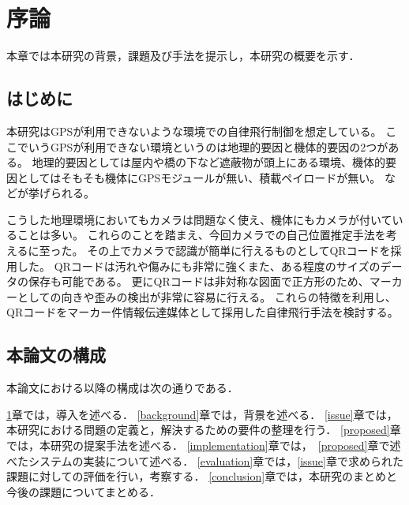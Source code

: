 \chapter{序論}
\label{introduction}

本章では本研究の背景，課題及び手法を提示し，本研究の概要を示す．

\section{はじめに}
\label{introduction:background}
本研究はGPSが利用できないような環境での自律飛行制御を想定している。
ここでいうGPSが利用できない環境というのは地理的要因と機体的要因の2つがある。
地理的要因としては屋内や橋の下など遮蔽物が頭上にある環境、機体的要因としてはそもそも機体にGPSモジュールが無い、積載ペイロードが無い。
などが挙げられる。

こうした地理環境においてもカメラは問題なく使え、機体にもカメラが付いていることは多い。
これらのことを踏まえ、今回カメラでの自己位置推定手法を考えるに至った。
その上でカメラで認識が簡単に行えるものとしてQRコードを採用した。
QRコードは汚れや傷みにも非常に強くまた、ある程度のサイズのデータの保存も可能である。
更にQRコードは非対称な図面で正方形のため、マーカーとしての向きや歪みの検出が非常に容易に行える。
これらの特徴を利用し、QRコードをマーカー件情報伝達媒体として採用した自律飛行手法を検討する。


\section{本論文の構成}

本論文における以降の構成は次の通りである．

\ref{introduction}章では，導入を述べる．
\ref{background}章では，背景を述べる．
\ref{issue}章では，本研究における問題の定義と，解決するための要件の整理を行う．
\ref{proposed}章では，本研究の提案手法を述べる．
\ref{implementation}章では，~\ref{proposed}章で述べたシステムの実装について述べる．
\ref{evaluation}章では，\ref{issue}章で求められた課題に対しての評価を行い，考察する．
\ref{conclusion}章では，本研究のまとめと今後の課題についてまとめる．


